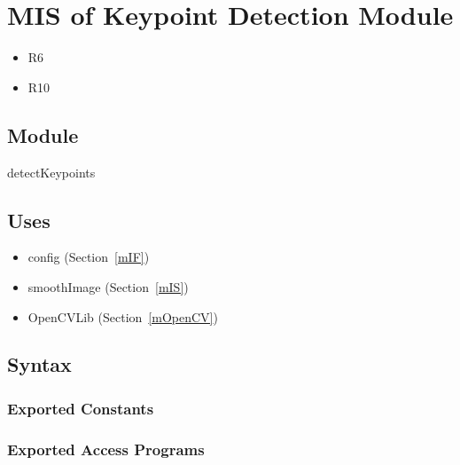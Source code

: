 \documentclass[12pt, titlepage]{article}
\begin{document}
\newpage
\section{MIS of Keypoint Detection Module} \label{mKD}
\begin{itemize}
  \item R6
  \item R10
\end{itemize}

\subsection{Module}
detectKeypoints

\subsection{Uses}
\begin{itemize}
  \item config (Section~\ref{mIF})
  \item smoothImage (Section~\ref{mIS}) %
  \item OpenCVLib (Section~\ref{mOpenCV})
\end{itemize}

\subsection{Syntax}

\subsubsection{Exported Constants}

\subsubsection{Exported Access Programs}
\end{document}

